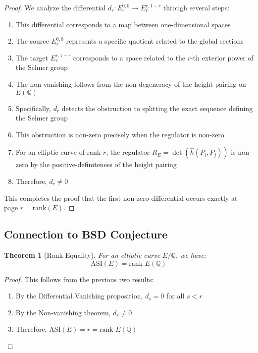 \documentclass{article}
\theoremstyle{plain}
\newtheorem{theorem}{Theorem}[section]
\theoremstyle{definition}
\theoremstyle{remark}
\begin{document}
\begin{proof}
We analyze the differential $d_r : E_r^{0,0} \to E_r^{r,1-r}$ through several steps:

\begin{enumerate}
\item This differential corresponds to a map between one-dimensional spaces
\item The source $E_r^{0,0}$ represents a specific quotient related to the global sections
\item The target $E_r^{r,1-r}$ corresponds to a space related to the $r$-th exterior power of the Selmer group
\item The non-vanishing follows from the non-degeneracy of the height pairing on $E(\mathbb{Q})$
\item Specifically, $d_r$ detects the obstruction to splitting the exact sequence defining the Selmer group
\item This obstruction is non-zero precisely when the regulator is non-zero
\item For an elliptic curve of rank $r$, the regulator $R_E = \det(\hat{h}(P_i, P_j))$ is non-zero by the positive-definiteness of the height pairing
\item Therefore, $d_r \neq 0$
\end{enumerate}

This completes the proof that the first non-zero differential occurs exactly at page $r = \text{rank}(E)$.
\end{proof}

\subsection{Connection to BSD Conjecture}

\begin{theorem}[Rank Equality]
For an elliptic curve $E/\mathbb{Q}$, we have:
\[
\text{ASI}(E) = \text{rank }E(\mathbb{Q})
\]
\end{theorem}

\begin{proof}
This follows from the previous two results:
\begin{enumerate}
\item By the Differential Vanishing proposition, $d_s = 0$ for all $s < r$
\item By the Non-vanishing theorem, $d_r \neq 0$
\item Therefore, $\text{ASI}(E) = r = \text{rank }E(\mathbb{Q})$
\end{enumerate}
\end{proof}
\end{document}
